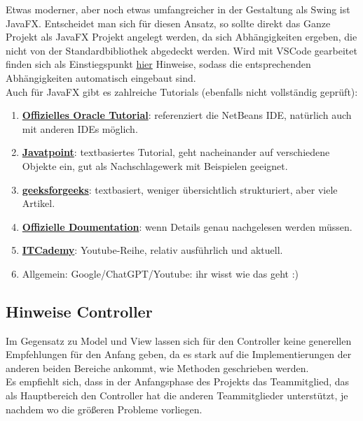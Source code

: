 \documentclass{article}
\begin{document}
Etwas moderner, aber noch etwas umfangreicher in der Gestaltung als Swing ist JavaFX. Entscheidet man sich für diesen Ansatz, so sollte direkt das Ganze Projekt als JavaFX Projekt angelegt werden, da sich Abhängigkeiten ergeben, die nicht von der Standardbibliothek abgedeckt werden. Wird mit VSCode gearbeitet finden sich als Einstiegspunkt \href{https://code.visualstudio.com/docs/java/java-gui}{hier} Hinweise, sodass die entsprechenden Abhängigkeiten automatisch eingebaut sind. \\
Auch für JavaFX gibt es zahlreiche Tutorials (ebenfalls nicht vollständig geprüft):
\begin{enumerate}
    \item \href{https://docs.oracle.com/javafx/2/get_started/jfxpub-get_started.htm}{\textbf{Offizielles Oracle Tutorial}}: referenziert die NetBeans IDE, natürlich auch mit anderen IDEs möglich. 
    \item \href{https://www.javatpoint.com/javafx-tutorial}{\textbf{Javatpoint}}: textbasiertes Tutorial, geht nacheinander auf verschiedene Objekte ein, gut als Nachschlagewerk mit Beispielen geeignet.
    \item \href{https://www.geeksforgeeks.org/javafx-tutorial/}{\textbf{geeksforgeeks}}: textbasiert, weniger übersichtlich strukturiert, aber viele Artikel. 
    \item  \href{https://docs.oracle.com/javafx/2/}{\textbf{Offizielle Doumentation}}: wenn Details genau nachgelesen werden müssen. 
    \item \href{https://www.youtube.com/playlist?list=PL7Rswbug-Foa9BwgUNxUUoVr15bbCIqTj}{\textbf{ITCademy}}: Youtube-Reihe, relativ ausführlich und aktuell.
    \item Allgemein: Google/ChatGPT/Youtube: ihr wisst wie das geht :)
\end{enumerate}

\subsection{Hinweise Controller}
\label{sec:hwController}

Im Gegensatz zu Model und View lassen sich für den Controller keine generellen Empfehlungen für den Anfang geben, da es stark auf die Implementierungen der anderen beiden Bereiche ankommt, wie Methoden geschrieben werden. \\
Es empfiehlt sich, dass in der Anfangsphase des Projekts das Teammitglied, das als Hauptbereich den Controller hat die anderen Teammitglieder unterstützt, je nachdem wo die größeren Probleme vorliegen. 
\newpage
\end{document}
